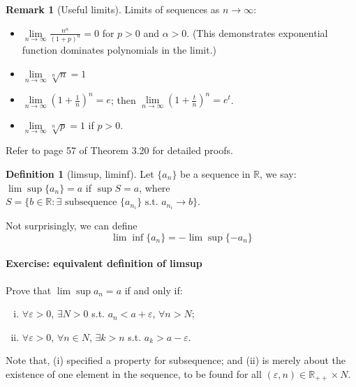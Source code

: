 \documentclass[12pt]{article}
\newcommand{\R}{{\mathbb R}}
\theoremstyle{definition}
\newtheorem{definition}[theorem]{Definition}
\newtheorem{remark}[theorem]{Remark}
\theoremstyle{plain}
\begin{document}
\begin{remark}
    [Useful limits] Limits of sequences as $n \to \infty$:
    \begin{itemize}
        \item $\underset{n\to\infty}  \lim \frac{n^\alpha}{(1+p)^n} = 0$ for $p
            > 0$ and $\alpha> 0$. (This demonstrates exponential function
            dominates polynomials in the limit.)
        \item $\underset{n\to\infty} \lim \sqrt[n]{n} =  1$
        \item $\underset{n\to\infty} \lim \left( 1 + \frac{1}{n} \right)^n = e$; then
            $\underset{n\to\infty} \lim \left( 1 + \frac{t}{n} \right)^n = e^t$.
        \item $\underset{n\to\infty} \lim \sqrt[n]{p} = 1$ if $p  > 0$.
    \end{itemize}

    Refer to page 57 of \cite{rudin1976principles} Theorem 3.20 for detailed
    proofs.
\end{remark}

\begin{definition}
    [limsup, liminf]
    Let $\{a_n\}$ be a sequence in $\R$, we say:
    $
        \lim\sup \{a_n\} = a
    $
    if $\sup S = a$, where $S = \{ b \in \R : \exists \text{ subsequence }
    \{a_{n_i}\} \text{ s.t. } a_{n_i} \to b\}$.

    Not surprisingly, we can define
    \[
        \lim\inf \{ a_n \} = - \lim \sup \{ - a_n\}
    \]
\end{definition}

\paragraph{Exercise: equivalent definition of limsup} Prove that $\lim\sup a_n =
a$ if and only if:
\begin{enumerate}[(i)]
    \item $\forall \varepsilon > 0$, $\exists N > 0$ s.t. $a_n < a +
        \varepsilon$, $\forall n > N$;
    \item $\forall \varepsilon > 0$, $\forall n \in N$, $\exists k > n$ s.t.
        $a_k > a - \varepsilon$.
\end{enumerate}
Note that, (i) specified a property for subsequence; and (ii) is merely about
the existence of one element in the sequence, to be found for all $(\varepsilon,
n) \in \R_{++} \times N$.
\end{document}
